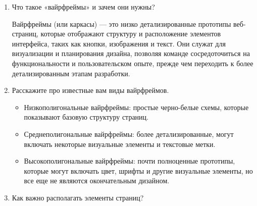 \begin{enumerate}
    \item Что такое «вайрфреймы» и зачем они нужны?

    Вайрфреймы (или каркасы) — это низко детализированные прототипы веб-страниц, которые отображают структуру и расположение элементов интерфейса, таких как кнопки, изображения и текст. Они служат для визуализации и планирования дизайна, позволяя команде сосредоточиться на функциональности и пользовательском опыте, прежде чем переходить к более детализированным этапам разработки.
    \item Расскажите про известные вам виды вайрфреймов.

        \begin{itemize}
            \item Низкополигональные вайрфреймы: простые черно-белые схемы, которые показывают базовую структуру страниц.
            \item Среднеполигональные вайрфреймы: более детализированные, могут включать некоторые визуальные элементы и текстовые метки.
            \item Высокополигональные вайрфреймы: почти полноценные прототипы, которые могут включать цвет, шрифты и другие визуальные элементы, но все еще не являются окончательным дизайном.
        \end{itemize}
    \item Как важно располагать элементы страниц?


\end{enumerate}
